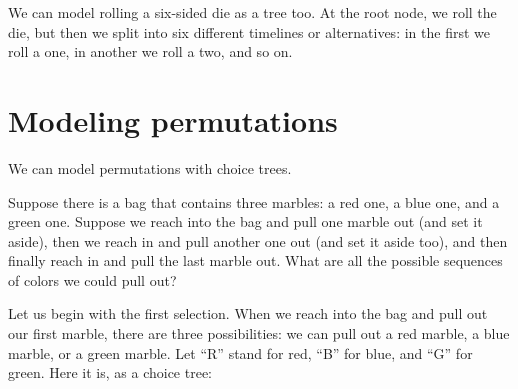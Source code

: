 \documentclass[../../../main.tex]{subfiles}
\begin{document}
We can model rolling a six-sided die as a tree too. At the root node, we roll the die, but then we split into six different timelines or alternatives: in the first we roll a one, in another we roll a two, and so on.

\begin{center}
\end{center}


\section{Modeling permutations}

We can model permutations with choice trees.

Suppose there is a bag that contains three marbles: a red one, a blue one, and a green one. Suppose we reach into the bag and pull one marble out (and set it aside), then we reach in and pull another one out (and set it aside too), and then finally reach in and pull the last marble out. What are all the possible sequences of colors we could pull out?

Let us begin with the first selection. When we reach into the bag and pull out our first marble, there are three possibilities: we can pull out a red marble, a blue marble, or a green marble. Let ``R'' stand for red, ``B'' for blue, and ``G'' for green. Here it is, as a choice tree:

\begin{center}
\end{center}
\end{document}
